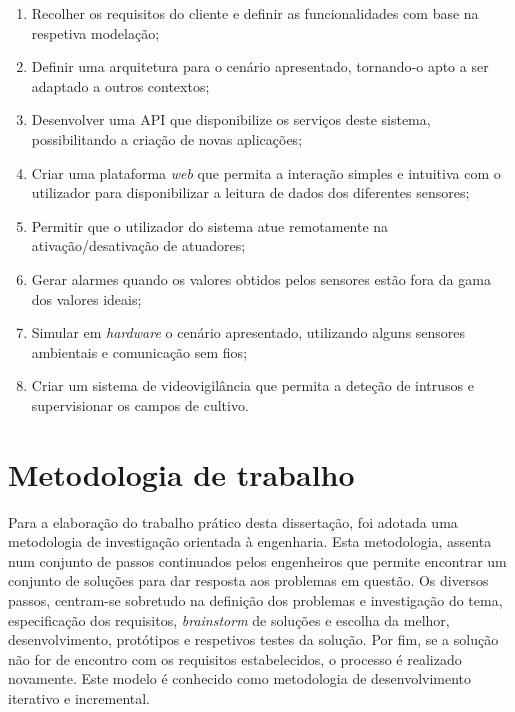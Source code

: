 \begin{enumerate}

	\item Recolher os requisitos do cliente e definir as funcionalidades com base na respetiva modelação; 
	
	\item Definir uma arquitetura para o cenário apresentado, tornando-o apto a ser adaptado a outros contextos; 
	
	\item Desenvolver uma \ac{API} que disponibilize os serviços deste sistema, possibilitando a criação de novas aplicações;   
	
	\item Criar uma plataforma \textit{web} que permita a  interação simples e intuitiva com o utilizador para disponibilizar a leitura de dados dos diferentes sensores; 
	
	\item Permitir que o utilizador do sistema atue remotamente na ativação/desativação de atuadores; 
	
	
	\item Gerar alarmes quando os valores obtidos pelos sensores estão fora da gama dos valores ideais; 
	
	\item Simular em \textit{hardware} o cenário apresentado, utilizando alguns sensores ambientais e comunicação sem fios; 
	
	\item Criar um sistema de videovigilância que permita a deteção de intrusos e supervisionar os campos de cultivo. 

\end{enumerate}










\section{Metodologia de trabalho}
\label{method}


Para a elaboração do trabalho prático desta dissertação, foi adotada uma metodologia de investigação orientada à engenharia\cite{desingprocess}. Esta metodologia, assenta num conjunto de passos continuados pelos engenheiros que permite encontrar um conjunto de soluções para dar resposta aos problemas em questão. Os diversos passos, centram-se sobretudo na definição dos problemas e investigação do tema, especificação dos requisitos, \textit{brainstorm} de soluções e escolha da melhor, desenvolvimento, protótipos e respetivos testes da solução. Por fim, se a solução não for de encontro com os requisitos estabelecidos, o processo é realizado novamente\cite{desingprocess}. Este modelo é conhecido como metodologia de desenvolvimento iterativo e incremental. 


